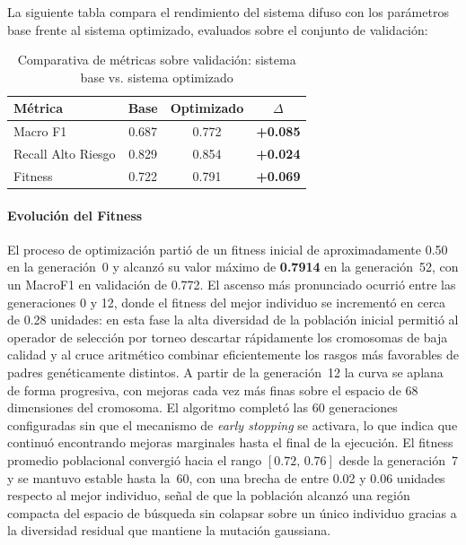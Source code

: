 \documentclass[11pt]{article}
\begin{document}
La siguiente tabla compara el rendimiento del sistema difuso con los par\'ametros base frente al sistema optimizado, evaluados sobre el conjunto de validaci\'on:

\begin{table}[H]
    \centering
    \caption{Comparativa de m\'etricas sobre validaci\'on: sistema base vs. sistema optimizado}
    \begin{tabular}{lccc}
        \toprule
        \textbf{M\'etrica}   & \textbf{Base} & \textbf{Optimizado} & \textbf{$\Delta$} \\
        \midrule
        Macro F1              & 0.687         & 0.772               & \textbf{+0.085}   \\
        Recall Alto Riesgo    & 0.829         & 0.854               & \textbf{+0.024}   \\
        Fitness               & 0.722         & 0.791               & \textbf{+0.069}   \\
        \bottomrule
    \end{tabular}
    \label{tab:resultados}
    \par{}
\end{table}

\paragraph{Evoluci\'on del Fitness}

El proceso de optimizaci\'on parti\'o de un fitness inicial de aproximadamente 0.50 en la generaci\'on~0 y alcanz\'o su valor m\'aximo de \textbf{0.7914} en la generaci\'on~52, con un MacroF1 en validaci\'on de 0.772. El ascenso m\'as pronunciado ocurri\'o entre las generaciones 0 y 12, donde el fitness del mejor individuo se increment\'o en cerca de 0.28 unidades: en esta fase la alta diversidad de la poblaci\'on inicial permiti\'o al operador de selecci\'on por torneo descartar r\'apidamente los cromosomas de baja calidad y al cruce aritm\'etico combinar eficientemente los rasgos m\'as favorables de padres gen\'eticamente distintos. A partir de la generaci\'on~12 la curva se aplana de forma progresiva, con mejoras cada vez m\'as finas sobre el espacio de 68 dimensiones del cromosoma. El algoritmo complet\'o las 60 generaciones configuradas sin que el mecanismo de \textit{early stopping} se activara, lo que indica que continu\'o encontrando mejoras marginales hasta el final de la ejecuci\'on. El fitness promedio poblacional convergi\'o hacia el rango $[0.72,\,0.76]$ desde la generaci\'on~7 y se mantuvo estable hasta la~60, con una brecha de entre 0.02 y 0.06 unidades respecto al mejor individuo, se\~nal de que la poblaci\'on alcanz\'o una regi\'on compacta del espacio de b\'usqueda sin colapsar sobre un \'unico individuo gracias a la diversidad residual que mantiene la mutaci\'on gaussiana.
\end{document}
